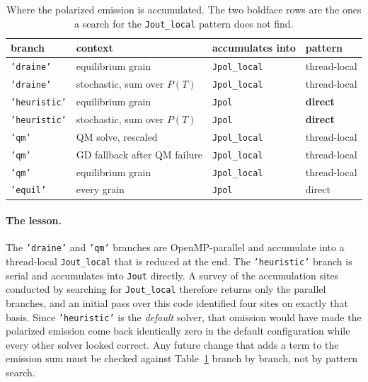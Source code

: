 \documentclass{my_memo}
\newcommand{\code}[1]{\texttt{#1}}
\begin{document}
\begin{table}[h]
\centering
\small
\begin{tabular}{@{}llll@{}}
\toprule
branch & context & accumulates into & pattern \\
\midrule
\code{'draine'}    & equilibrium grain            & \code{Jpol\_local} & thread-local \\
\code{'draine'}    & stochastic, sum over $P(T)$  & \code{Jpol\_local} & thread-local \\
\code{'heuristic'} & equilibrium grain            & \code{Jpol}        & \textbf{direct} \\
\code{'heuristic'} & stochastic, sum over $P(T)$  & \code{Jpol}        & \textbf{direct} \\
\code{'qm'}        & QM solve, rescaled           & \code{Jpol\_local} & thread-local \\
\code{'qm'}        & GD fallback after QM failure & \code{Jpol\_local} & thread-local \\
\code{'qm'}        & equilibrium grain            & \code{Jpol\_local} & thread-local \\
\code{'equil'}     & every grain                  & \code{Jpol}        & direct \\
\bottomrule
\end{tabular}
\caption{Where the polarized emission is accumulated. The two boldface rows
are the ones a search for the \code{Jout\_local} pattern does not find.}
\label{tab:sites}
\end{table}

\paragraph{The lesson.} The \code{'draine'} and \code{'qm'} branches are
OpenMP-parallel and accumulate into a thread-local \code{Jout\_local} that is
reduced at the end. The \code{'heuristic'} branch is serial and accumulates
into \code{Jout} directly. A survey of the accumulation sites conducted by
searching for \code{Jout\_local} therefore returns only the parallel branches,
and an initial pass over this code identified four sites on exactly that basis.
Since \code{'heuristic'} is the \emph{default} solver, that omission would have
made the polarized emission come back identically zero in the default
configuration while every other solver looked correct. Any future change that
adds a term to the emission sum must be checked against
Table~\ref{tab:sites} branch by branch, not by pattern search.
\end{document}
